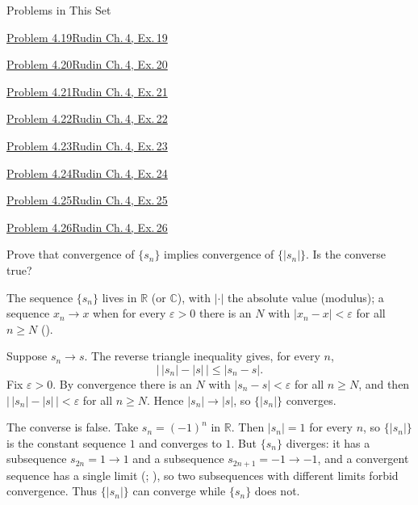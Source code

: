 \documentclass[main.tex]{subfiles}
\begin{document}
\begin{lecturecontents}{Problems in This Set}
  \item \hyperlink{prob:4.19}{Problem 4.19\quad Rudin Ch.\,4, Ex.\,19}
  \item \hyperlink{prob:4.20}{Problem 4.20\quad Rudin Ch.\,4, Ex.\,20}
  \item \hyperlink{prob:4.21}{Problem 4.21\quad Rudin Ch.\,4, Ex.\,21}
  \item \hyperlink{prob:4.22}{Problem 4.22\quad Rudin Ch.\,4, Ex.\,22}
  \item \hyperlink{prob:4.23}{Problem 4.23\quad Rudin Ch.\,4, Ex.\,23}
  \item \hyperlink{prob:4.24}{Problem 4.24\quad Rudin Ch.\,4, Ex.\,24}
  \item \hyperlink{prob:4.25}{Problem 4.25\quad Rudin Ch.\,4, Ex.\,25}
  \item \hyperlink{prob:4.26}{Problem 4.26\quad Rudin Ch.\,4, Ex.\,26}
\end{lecturecontents}

\par\bigskip{}\par\nobreak\smallskip

Prove that convergence of $\{s_{n}\}$ implies convergence of $\{|s_{n}|\}$. Is the converse true?

\begin{SolutionBlue}
The sequence $\{s_n\}$ lives in $\mathbb R$ (or $\mathbb C$), with $|\cdot|$ the absolute value
(modulus); a sequence $x_n\to x$ when for every $\varepsilon>0$ there is an $N$ with $|x_n-x|<\varepsilon$
for all $n\ge N$ ().

Suppose $s_n\to s$. The reverse triangle inequality gives, for every $n$,
\[
\bigl|\,|s_n|-|s|\,\bigr|\le |s_n-s|.
\]
Fix $\varepsilon>0$. By convergence there is an $N$ with $|s_n-s|<\varepsilon$ for all $n\ge N$, and then
$\bigl|\,|s_n|-|s|\,\bigr|<\varepsilon$ for all $n\ge N$. Hence $|s_n|\to|s|$, so $\{|s_n|\}$ converges.

The converse is false. Take $s_n=(-1)^n$ in $\mathbb R$. Then $|s_n|=1$ for every $n$, so $\{|s_n|\}$ is
the constant sequence $1$ and converges to $1$. But $\{s_n\}$ diverges: it has a subsequence
$s_{2n}=1\to 1$ and a subsequence $s_{2n+1}=-1\to-1$, and a convergent sequence has a single limit
(; ), so two subsequences with different limits
forbid convergence. Thus $\{|s_n|\}$ can converge while $\{s_n\}$ does not.
\end{SolutionBlue}
\end{document}
